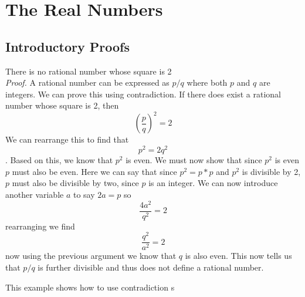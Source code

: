 \chapter{The Real Numbers}
\section{Introductory Proofs}
\begin{theorem}
There is no rational number whose square is 2 \\
\textit{Proof.} A rational number can be expressed as $ p/q $ where both $ p $ and $ q $ are integers. We can prove this using contradiction. If there does exist a rational number whose square is 2, then $$ \left(\dfrac{p}{q}\right)^2 = 2$$ We can rearrange this to find that \[ p^2 = 2 q^2 \]. Based on this, we know that $ p^2 $ is even. We must now show that since $ p^2 $ is even $ p $ must also be even. Here we can say that since $ p^2 = p * p $ and $ p^2 $ is divisible by 2, $ p $ must also be divisible by two, since $ p $ is an integer. We can now introduce another variable $ a $ to say $ 2a = p $ so \[ \dfrac{4a^2}{q^2} = 2 \] rearranging we find 
\[ \dfrac{q^2}{a^2} = 2 \] now using the previous argument we know that $ q $ is also even. This now tells us that $ p/q $ is further divisible and thus does not define a rational number.  
\end{theorem} 
This example shows how to use contradiction s														 												